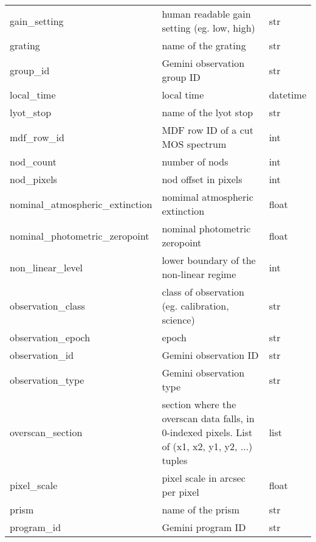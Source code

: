 \documentclass[letterpaper,10pt,english]{sphinxmanual}
\begin{document}
\begin{longtable}{|l|l|l|}
gain\_setting
 & 
human readable gain setting (eg. low, high)
 & 
str
\\

grating
 & 
name of the grating
 & 
str
\\

group\_id
 & 
Gemini observation group ID
 & 
str
\\

local\_time
 & 
local time
 & 
datetime
\\

lyot\_stop
 & 
name of the lyot stop
 & 
str
\\

mdf\_row\_id
 & 
MDF row ID of a cut MOS spectrum
 & 
int
\\

nod\_count
 & 
number of nods
 & 
int
\\

nod\_pixels
 & 
nod offset in pixels
 & 
int
\\

nominal\_atmospheric\_extinction
 & 
nomimal atmospheric extinction
 & 
float
\\

nominal\_photometric\_zeropoint
 & 
nominal photometric zeropoint
 & 
float
\\

non\_linear\_level
 & 
lower boundary of the non-linear regime
 & 
int
\\

observation\_class
 & 
class of observation (eg. calibration, science)
 & 
str
\\

observation\_epoch
 & 
epoch
 & 
str
\\

observation\_id
 & 
Gemini observation ID
 & 
str
\\

observation\_type
 & 
Gemini observation type
 & 
str
\\

overscan\_section
 & 
section where the overscan data falls, in 0-indexed pixels.
List of (x1, x2, y1, y2, ...) tuples
 & 
list
\\

pixel\_scale
 & 
pixel scale in arcsec per pixel
 & 
float
\\

prism
 & 
name of the prism
 & 
str
\\

program\_id
 & 
Gemini program ID
 & 
str
\\


\end{longtable}
\end{document}
